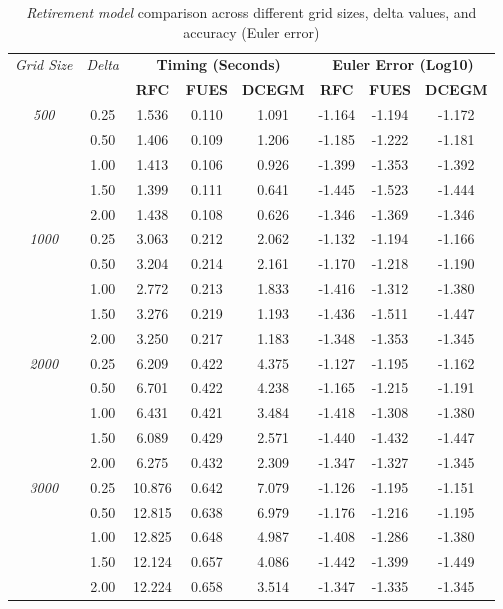 
\begin{table}[htbp]
\centering
\small
\begin{tabular}{ccccc|ccc}
\toprule
\multirow{2}{*}{\textit{Grid Size}} & \multirow{2}{*}{\textit{Delta}} & \multicolumn{3}{c}{\textbf{Timing (Seconds)}} & \multicolumn{3}{c}{\textbf{Euler Error (Log10)}} \\
 & & \textbf{RFC} & \textbf{FUES} & \textbf{DCEGM} & \textbf{RFC} & \textbf{FUES} & \textbf{DCEGM} \\
\midrule
\multirow{5}{*}{\textit{500}} 
& 0.25 & 1.536 & 0.110 & 1.091 & -1.164 & -1.194 & -1.172 \\
 & 0.50 & 1.406 & 0.109 & 1.206 & -1.185 & -1.222 & -1.181 \\
 & 1.00 & 1.413 & 0.106 & 0.926 & -1.399 & -1.353 & -1.392 \\
 & 1.50 & 1.399 & 0.111 & 0.641 & -1.445 & -1.523 & -1.444 \\
 & 2.00 & 1.438 & 0.108 & 0.626 & -1.346 & -1.369 & -1.346 \\
\midrule
\multirow{5}{*}{\textit{1000}} 
& 0.25 & 3.063 & 0.212 & 2.062 & -1.132 & -1.194 & -1.166 \\
 & 0.50 & 3.204 & 0.214 & 2.161 & -1.170 & -1.218 & -1.190 \\
 & 1.00 & 2.772 & 0.213 & 1.833 & -1.416 & -1.312 & -1.380 \\
 & 1.50 & 3.276 & 0.219 & 1.193 & -1.436 & -1.511 & -1.447 \\
 & 2.00 & 3.250 & 0.217 & 1.183 & -1.348 & -1.353 & -1.345 \\
\midrule
\multirow{5}{*}{\textit{2000}} 
& 0.25 & 6.209 & 0.422 & 4.375 & -1.127 & -1.195 & -1.162 \\
 & 0.50 & 6.701 & 0.422 & 4.238 & -1.165 & -1.215 & -1.191 \\
 & 1.00 & 6.431 & 0.421 & 3.484 & -1.418 & -1.308 & -1.380 \\
 & 1.50 & 6.089 & 0.429 & 2.571 & -1.440 & -1.432 & -1.447 \\
 & 2.00 & 6.275 & 0.432 & 2.309 & -1.347 & -1.327 & -1.345 \\
\midrule
\multirow{5}{*}{\textit{3000}} 
& 0.25 & 10.876 & 0.642 & 7.079 & -1.126 & -1.195 & -1.151 \\
 & 0.50 & 12.815 & 0.638 & 6.979 & -1.176 & -1.216 & -1.195 \\
 & 1.00 & 12.825 & 0.648 & 4.987 & -1.408 & -1.286 & -1.380 \\
 & 1.50 & 12.124 & 0.657 & 4.086 & -1.442 & -1.399 & -1.449 \\
 & 2.00 & 12.224 & 0.658 & 3.514 & -1.347 & -1.335 & -1.345 \\
\midrule

\bottomrule
\end{tabular}
\caption{\textit{Retirement model} comparison across different grid sizes, delta values, and accuracy (Euler error)}
\label{tab:timing_sigma05_comparison}
\end{table}
